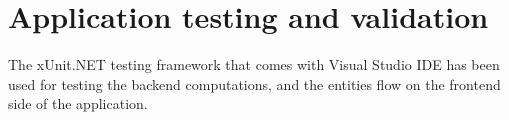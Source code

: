 \section{Application testing and validation}

The xUnit.NET testing framework that comes with Visual Studio IDE has been used for testing the backend computations, and the entities flow on the frontend side of the application. 

